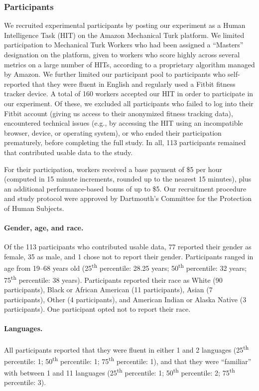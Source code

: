 \documentclass[10pt]{article}
\begin{document}
\subsubsection*{Participants}
We recruited experimental participants by posting our experiment as a
Human Intelligence Task (HIT) on the Amazon Mechanical Turk platform.
We limited participation to Mechanical Turk Workers who had been
assigned a ``Masters'' designation on the platform, given to workers
who score highly across several metrics on a large number of HITs,
according to a proprietary algorithm managed by Amazon.  We further
limited our participant pool to participants who self-reported that
they were fluent in English and regularly used a Fitbit fitness
tracker device.  A total of 160 workers accepted our
HIT in order to participate in our experiment.  Of these, we excluded all
participants who failed to log into their Fitbit account (giving us
access to their anonymized fitness tracking data), encountered
technical issues (e.g., by accessing the HIT using an incompatible browser, device, or
operating system), or who ended their participation prematurely,
before completing the full study.  In all, 113 participants remained
that contributed usable data to the study.

For their participation, workers received a base payment of \$5 per hour (computed in 15
minute increments, rounded up to the nearest 15 minutes), plus an
additional performance-based bonus of up to \$5.  Our recruitment
procedure and study protocol
were approved by Dartmouth's Committee for the Protection of Human Subjects.

\paragraph{Gender, age, and race.}
Of the 113 participants who contributed usable data, 77 reported their gender as female, 35 as
male, and 1 chose not to report their gender.  Participants ranged in
age from 19--68 years old (25\textsuperscript{th} percentile: 28.25
years; 50\textsuperscript{th} percentile: 32 years;
75\textsuperscript{th} percentile: 38 years).  Participants reported
their race as White (90 participants), Black or African American (11
participants), Asian (7 participants), Other (4 participants), and
American Indian or Alaska Native (3 participants).  One participant
opted not to report their race.

\paragraph{Languages.}
All participants reported that they were fluent in either 1 and 2
languages (25\textsuperscript{th} percentile: 1;
50\textsuperscript{th} percentile: 1; 75\textsuperscript{th}
percentile: 1), and that they were ``familiar'' with between 1 and 11
languages (25\textsuperscript{th} percentile: 1;
50\textsuperscript{th} percentile: 2; 75\textsuperscript{th}
percentile: 3).
\end{document}
